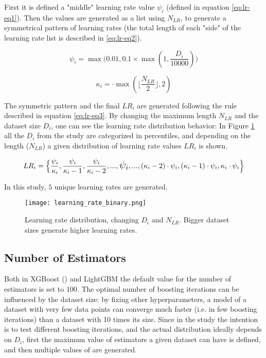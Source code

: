 First it is defined a "middle" learning rate value $\psi_i$ (defined in equation \ref{eq:lr-eq1}). Then the values are generated as a list using $N_{LR}$, to generate a symmetrical pattern of learning rates (the total length of each "side" of the learning rate list is described in \ref{eq:lr-eq2}).

\begin{equation}
    \psi_i = \max\Big(0.01, 0.1 \times \max(1, \frac{D_i}{10000})\Big)
    \label{eq:lr-eq1}
\end{equation}

\begin{equation}
    \kappa_i = \cdot \max\left(\lfloor\frac{N_{LR}}{2}\rfloor, 2\right)
    \label{eq:lr-eq2}
\end{equation}

The symmetric pattern and the final $LR_i$ are generated following the rule described in equation \ref{eq:lr-eq3}. By changing the maximum length $N_{LR}$ and the dataset size $D_i$, one can see the learning rate distribution behavior: In Figure \ref{fig:hyperparam-lr1} all the $D_i$ from the study are categorized in percentiles, and depending on the length ($N_{LR}$) a given distribution of learning rate values $LR_i$ is shown.

\begin{equation}
    LR_i = \Big\{\frac{\psi_i}{\kappa_i}, \frac{\psi_i}{\kappa_i - 1}, \frac{\psi_i}{\kappa_i - 2}, ..., \text{\Large $\psi_i$}, ..., (\kappa_i - 2)\cdot\psi_i, (\kappa_i - 1)\cdot\psi_i, \kappa_i\cdot\psi_i\Big\}
    \label{eq:lr-eq3}
\end{equation}

In this study, $5$ unique learning rates are generated.

\begin{figure}[H]
    \centering
    \texttt{[image: learning\_rate\_binary.png]} 
    \caption{Learning rate distribution, changing $D_i$ and $N_{LR}$. Bigger dataset sizes generate higher learning rates.}
    \label{fig:hyperparam-lr1}
\end{figure}

\subsection{Number of Estimators}
\label{subsec:hp-space-num-est}

Both in XGBoost () and LightGBM the default value for the number of estimators is set to $100$. The optimal number of boosting iterations can be influenced by the dataset size: by fixing other hyperparameters, a model of a dataset with very few data points can converge much faster (i.e. in few boosting iterations) than a dataset with 10 times its size. Since in the study the intention is to test different boosting iterations, and the actual distribution ideally depends on $D_i$, first the maximum value of estimators a given dataset can have is defined, and then  multiple values of  are generated. 

